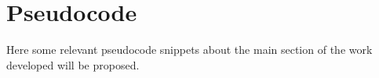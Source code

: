 \chapter{Pseudocode}
\label{chapter:pseudocode}

Here some relevant pseudocode snippets about the main section of the work developed will be proposed.

\begin{figure}[b]
	\begin{center}
	\end{center}
\end{figure}

